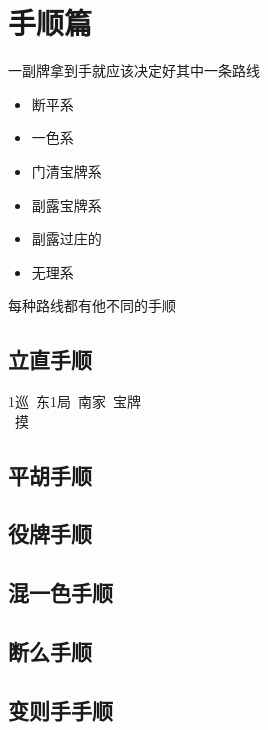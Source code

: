 \documentclass[小V的日麻笔记.tex]{subfiles}
\begin{document}
\chapter{手顺篇}
一副牌拿到手就应该决定好其中一条路线
\begin{itemize}
\item 断平系
\item 一色系
\item 门清宝牌系
\item 副露宝牌系
\item 副露过庄的
\item 无理系
\end{itemize}

每种路线都有他不同的手顺
\section{立直手顺}
1巡\ 东1局\ 南家\ 宝牌\\
\ 摸

\section{平胡手顺}
\section{役牌手顺}
\section{混一色手顺}
\section{断么手顺}
\section{变则手手顺}
\end{document}
